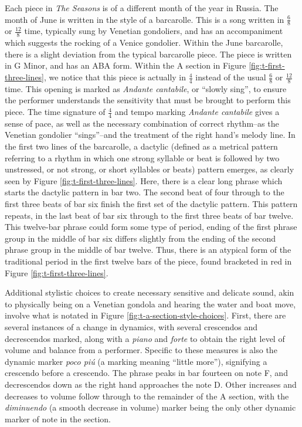 Each piece in \textit{The Seasons} is of a different month of the year in Russia. The month of June is written in the style of a barcarolle. This is a song written in $\frac{6}{8}$ or $\frac{12}{8}$ time, typically sung by Venetian gondoliers, and has an accompaniment which suggests the rocking of a Venice gondolier\autocite{Latham_2011_barcarolle}. Within the June barcarolle, there is a slight deviation from the typical barcarolle piece. The piece is written in G Minor, and has an ABA form. Within the A section in Figure \ref{fig:t-first-three-lines}, we notice that this piece is actually in $\frac{4}{4}$ instead of the usual $\frac{6}{8}$ or $\frac{12}{8}$ time. This opening is marked as \textit{Andante cantabile}, or ``slowly sing'', to ensure the performer understands the sensitivity that must be brought to perform this piece. The time signature of $\frac{4}{4}$ and tempo marking \textit{Andante cantabile} gives a sense of pace, as well as the necessary combination of correct rhythm--as the Venetian gondolier ``sings''--and the treatment of the right hand's melody line. In the first two lines of the barcarolle, a dactylic (defined as a metrical pattern referring to a rhythm in which one strong syllable or beat is followed by two unstressed, or not strong, or short syllables or beats)\autocite{dactylic} pattern emerges, as clearly seen by Figure \ref{fig:t-first-three-lines}\autocite{Henle_2002}. Here, there is a clear long phrase which starts the dactylic pattern in bar two. The second beat of four through to the first three beats of bar six finish the first set of the dactylic pattern. This pattern repeats, in the last beat of bar six through to the first three beats of bar twelve. This twelve-bar phrase could form some type of period, ending of the first phrase group in the middle of bar six differs slightly from the ending of the second phrase group in the middle of bar twelve. Thus, there is an atypical form of the traditional period in the first twelve bars of the piece, found bracketed in red in Figure \ref{fig:t-first-three-lines}\autocite{Henle_2002}. 

Additional stylistic choices to create necessary sensitive and delicate sound, akin to physically being on a Venetian gondola and hearing the water and boat move, involve what is notated in Figure \ref{fig:t-a-section-style-choices}\autocite{Henle_2002}. First, there are several instances of a change in dynamics, with several crescendos and decrescendos marked, along with a \textit{piano} and \textit{forte} to obtain the right level of volume and balance from a performer. Specific to these measures is also the dynamic marker \textit{poco piú} (a marking meaning ``little more''), signifying a crescendo before a crescendo. The phrase peaks in bar fourteen on note F, and decrescendos down as the right hand approaches the note D. Other increases and decreases to volume follow through to the remainder of the A section, with the \textit{diminuendo} (a smooth decrease in volume) marker being the only other dynamic marker of note in the section.

